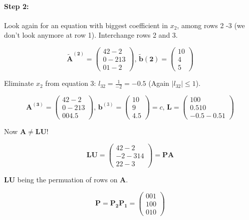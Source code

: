 \paragraph{Step 2:}
Look again for an equation with biggest coefficient in \(x_2\), among rows 2 -3 
(we don't look anymore at row 1). Interchange rows 2 and 3.

\[
	\mathbf{\tilde{A}^{(2)}} =
	\begin{pmatrix}
 		4  2 -2 \\
 		0 -2 13 \\
 		0  1 -2 		   
	\end{pmatrix} \text{, }
	\mathbf{\tilde{b}(2)} =
	\begin{pmatrix}
		10 \\
		 4 \\
		 5
	\end{pmatrix}
\]

Eliminate \(x_2\) from equation 3: \(l_{32} = \frac{1}{-2} = -0.5\) (Again
\(|l_{32}| \leq 1\)).

\[
	\mathbf{A^{(3)}} =
	\begin{pmatrix}
 		4  2 -2 \\
 		0 -2 13 \\
 		0  0 4.5      
	\end{pmatrix} \text{, }
	\mathbf{b}^{(3)} =
	\begin{pmatrix}
		10 \\
		 9 \\
		 4.5
	\end{pmatrix} = c \text{, }
	\mathbf{L} = \begin{pmatrix}
 		1 0 0 \\
 		0.5 1 0 \\
 		-0.5 -0.5 1   
	\end{pmatrix}
\]

Now \(\mathbf{A} \neq \mathbf{LU}\)!

\[
	\mathbf{LU} = 
	\begin{pmatrix}
 		4  2 -2 \\
 		-2 -3 14 \\
 		2 2 -3  
	\end{pmatrix} =
	\mathbf{PA}
\]

\(\mathbf{LU}\) being the permuation of rows on \(\mathbf{A}\).

\[
	\mathbf{P} = \mathbf{P_2 P_1} =
	\begin{pmatrix}
 		0 0 1 \\
 		1 0 0 \\
 		0 1 0
	\end{pmatrix}
\]

